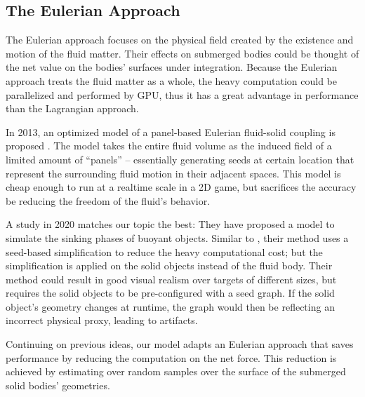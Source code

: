 \subsection{The Eulerian Approach}

The Eulerian approach focuses on the physical field created by the existence and motion of the fluid matter.
Their effects on submerged bodies could be thought of the net value on the bodies' surfaces under integration.
Because the Eulerian approach treats the fluid matter as a whole, the heavy computation could be parallelized and performed by GPU, thus it has a great advantage in performance than the Lagrangian approach.

In 2013, an optimized model of a panel-based Eulerian fluid-solid coupling is proposed \cite{GER13}.
The model takes the entire fluid volume as the induced field of a limited amount of ``panels'' -- essentially generating seeds at certain location that represent the surrounding fluid motion in their adjacent spaces.
This model is cheap enough to run at a realtime scale in a 2D game, but sacrifices the accuracy be reducing the freedom of the fluid's behavior.

A study in 2020 \cite{BAJ20} matches our topic the best:
They have proposed a model to simulate the sinking phases of buoyant objects.
Similar to \cite{GER13}, their method uses a seed-based simplification to reduce the heavy computational cost; but the simplification is applied on the solid objects instead of the fluid body.
Their method could result in good visual realism over targets of different sizes, but requires the solid objects to be pre-configured with a seed graph.
If the solid object's geometry changes at runtime, the graph would then be reflecting an incorrect physical proxy, leading to artifacts.

Continuing on previous ideas, our model adapts an Eulerian approach that saves performance by reducing the computation on the net force.
This reduction is achieved by estimating over random samples over the surface of the submerged solid bodies' geometries.